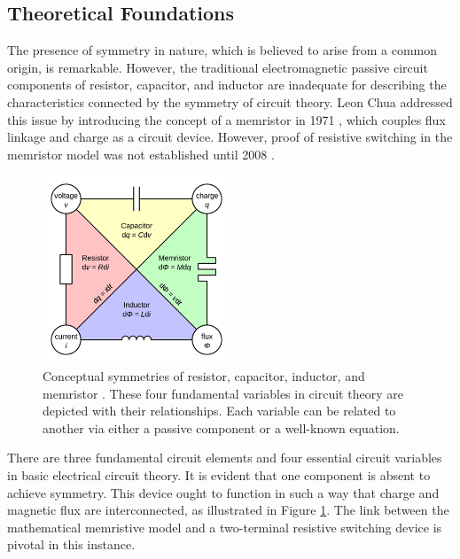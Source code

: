\subsection[Theoretical Foundations]{Theoretical Foundations}

The presence of symmetry in nature, which is believed to arise from a common origin, is remarkable.  However, the traditional electromagnetic passive circuit components of resistor, capacitor, and inductor are inadequate for describing the characteristics connected by the symmetry of circuit theory. Leon Chua addressed this issue by introducing the concept of a memristor in 1971 \cite{chua1971memristor}, which couples flux linkage and charge as a circuit device. However, proof of resistive switching in the memristor model was not established until 2008 \cite{strukov2008missing}. \\

\begin{figure}[htbp!] 
\centering    
\includegraphics[width=0.5\textwidth]{Chapter1/Figs/1a.png}
\caption[Conceptual symmetries of resistor, capacitor, inductor, and memristor]{Conceptual symmetries of resistor, capacitor, inductor, and memristor \cite{du2017metal}. These four fundamental variables in circuit theory are depicted with their relationships. Each variable can be related to another via either a passive component or a well-known equation.}
\label{fig:1a}
\end{figure}

\noindent There are three fundamental circuit elements and four essential circuit variables in basic electrical circuit theory.  It is evident that one component is absent to achieve symmetry. This device ought to function in such a way that charge and magnetic flux are interconnected, as illustrated in Figure \ref{fig:1a}. The link between the mathematical memristive model and a two-terminal resistive switching device is pivotal in this instance. \\

